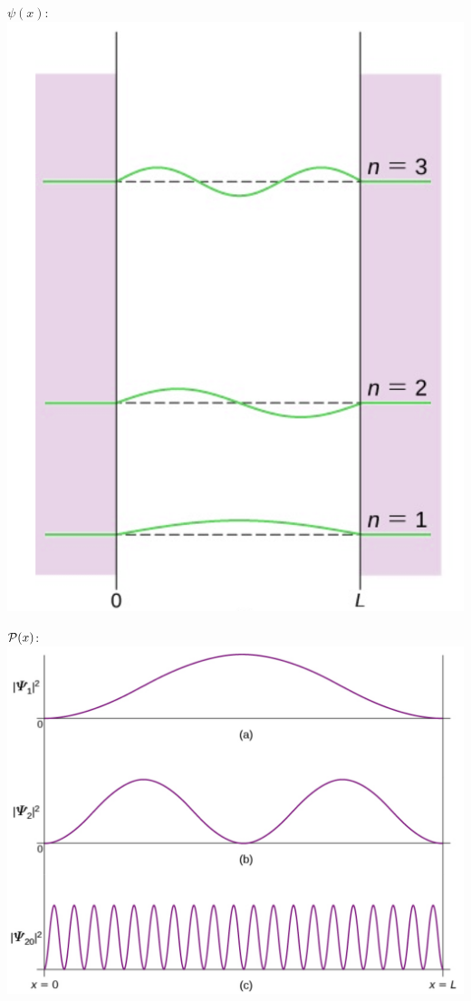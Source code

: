 \documentclass[12pt,oneside]{book}
\begin{document}
\begin{center}

	\begin{minipage}{0.3\linewidth}
		$\psi(x):$ \\
		\includegraphics[width=\linewidth]{../pic/3302/16.png}
	\end{minipage}
	\begin{minipage}{0.5\linewidth}
		$\mathcal{P}(x)$:\\
		\includegraphics[width=\linewidth]{../pic/3302/17.png}
	\end{minipage}

\end{center}
\end{document}
